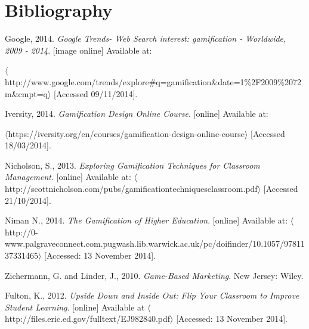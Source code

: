 \documentclass[10pt,a4paper]{report}
\begin{document}
\section*{Bibliography}
Google, 2014. \textit{Google Trends- Web Search interest: gamification - Worldwide, 2009 - 2014}. [image online] Available at: 

\noindent $\langle$http://www.google.com/trends/explore\#q=gamification\&date=1\%2F2009\%2072m\&cmpt=q$\rangle$ [Accessed 09/11/2014].
\newline

\noindent Iversity, 2014. \textit{Gamification Design Online Course}. [online] Available at: 

\noindent $\langle$https://iversity.org/en/courses/gamification-design-online-course$\rangle$ [Accessed 18/03/2014].
\newline

\noindent Nicholson, S., 2013. \textit{Exploring Gamification Techniques for Classroom Management}. [online] Available at: $\langle$http://scottnicholson.com/pubs/gamificationtechniquesclassroom.pdf$\rangle$ [Accessed 21/10/2014].
\newline

\noindent Niman N., 2014. \textit{The Gamification of Higher Education}. [online] Available at: $\langle$http://0-www.palgraveconnect.com.pugwash.lib.warwick.ac.uk/pc/doifinder/10.1057/9781137331465$\rangle$ [Accessed: 13 November 2014].
\newline

\noindent Zichermann, G. and Linder, J., 2010. \textit{Game-Based Marketing}. New Jersey: Wiley.
\newline

\noindent Fulton, K., 2012. \textit{Upside Down and Inside Out: Flip Your Classroom to Improve Student Learning}. [online] Available at $\langle$http://files.eric.ed.gov/fulltext/EJ982840.pdf$\rangle$ [Accessed: 13 November 2014].
\end{document}
